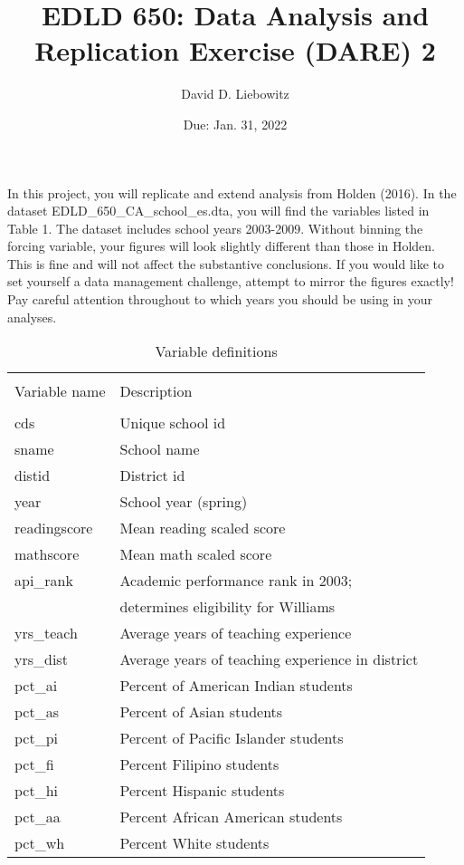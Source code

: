 \documentclass[a4paper, 11pt]{article}
\title{EDLD 650: Data Analysis and Replication Exercise (DARE) 2}
\author{David D. Liebowitz}
\date{Due: Jan. 31, 2022}
\begin{document}
\maketitle

In this project, you will replicate and extend analysis from Holden (2016). In the dataset EDLD\_650\_CA\_school\_es.dta, you will find the variables listed in Table 1. The dataset includes school years 2003-2009. Without binning the forcing variable, your figures will look slightly different than those in Holden. This is fine and will not affect the substantive conclusions. If you would like to set yourself a data management challenge, attempt to mirror the figures exactly! Pay careful attention throughout to which years you should be using in your analyses.

\begin{table}[!htbp] \centering 
  \caption{Variable definitions} 
  \label{} 
\begin{tabular}{ll} 
\\[-1.8ex]\hline 
\\[-1.8ex] Variable name & Description \\ 
\hline \\[-1.8ex]
cds & Unique school id \\
sname & School name \\
distid & District id \\
year & School year (spring) \\
readingscore & Mean reading scaled score \\
mathscore & Mean math scaled score \\
api\_rank & Academic performance rank in 2003;  \\
 & determines eligibility for Williams \\
yrs\_teach & Average years of teaching experience \\
yrs\_dist & Average years of teaching experience in district \\
pct\_ai & Percent of American Indian students \\
pct\_as & Percent of Asian students \\
pct\_pi & Percent of Pacific Islander students \\
pct\_fi & Percent Filipino students  \\
pct\_hi & Percent Hispanic students \\
pct\_aa & Percent African American students \\
pct\_wh & Percent White students \\

\end{tabular}
\end{table}
\end{document}
